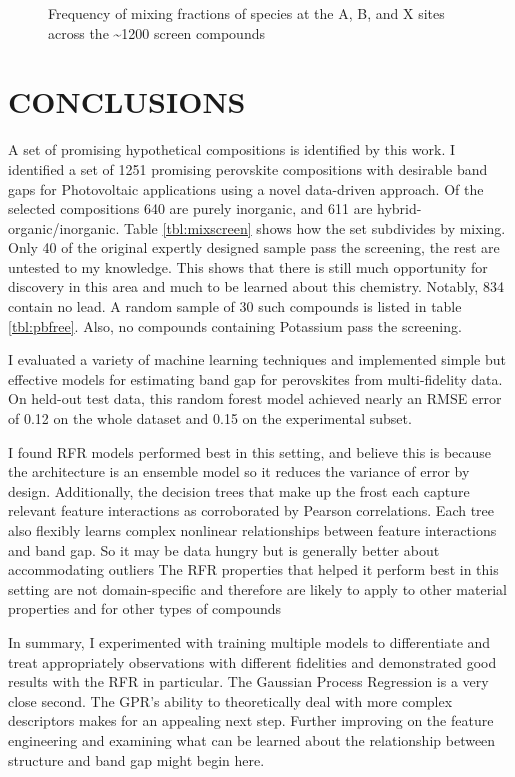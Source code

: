  
\begin{figure}[htbp]
\centering

\caption{\label{fig:freq} Frequency of mixing fractions of species at the A, B, and X sites across the \textasciitilde{}1200 screen compounds}
\end{figure}

\chapter{CONCLUSIONS}
\label{sec:orgbfd2f81}
A set of promising hypothetical compositions is identified by this work.
I identified a set of 1251 promising perovskite compositions with desirable band gaps for Photovoltaic applications using a novel data-driven approach.
Of the selected compositions 640 are purely inorganic, and 611 are hybrid-organic/inorganic.
Table \ref{tbl:mixscreen} shows how the set subdivides by mixing.
Only 40 of the original expertly designed sample pass the screening, the rest are untested to my knowledge.
This shows that there is still much opportunity for discovery in this area and much to be learned about this chemistry.
Notably, 834 contain no lead. A random sample of 30 such compounds is listed in table \ref{tbl:pbfree}.
Also, no compounds containing Potassium pass the screening.

I evaluated a variety of machine learning techniques and implemented simple but effective models for estimating band gap for perovskites from multi-fidelity data.
On held-out test data, this random forest model achieved nearly an RMSE error of 0.12 on the whole dataset and 0.15 on the experimental subset.

I found RFR models performed best in this setting, and believe this is because the architecture is an ensemble model so it reduces the variance of error by design.
Additionally, the decision trees that make up the frost each capture relevant feature interactions as corroborated by Pearson correlations.
Each tree also flexibly learns complex nonlinear relationships between feature interactions and band gap.
So it may be data hungry but is generally better about accommodating outliers
The RFR properties that helped it perform best in this setting are not domain-specific and therefore are likely to apply to other material properties and for other types of compounds

In summary, I experimented with training multiple models to differentiate and treat appropriately observations with different fidelities and demonstrated good results with the RFR in particular.
The Gaussian Process Regression is a very close second.
The GPR's ability to theoretically deal with more complex descriptors makes for an appealing next step.
Further improving on the feature engineering and examining what can be learned about the relationship between structure and band gap might begin here.

